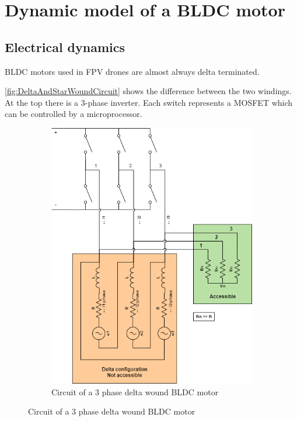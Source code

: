 \documentclass[]{report}
\begin{document}
\section{Dynamic model of a BLDC motor}

\subsection*{Electrical dynamics}
BLDC motors used in FPV drones are almost always delta terminated.

\autoref{fig:DeltaAndStarWoundCircuit} shows the difference between the two windings. At the top there is a 3-phase inverter. Each switch represents a MOSFET which can be controlled by a microprocessor.

\begin{figure}[H]
	\centering
	\begin{subfigure}{0.49\textwidth}
		\centering
		\includegraphics[width=\textwidth]{Draw_IO/BLDC_Dynamics_deltaCircuit.png}
		\caption{Circuit of a 3 phase delta wound BLDC motor}

\end{subfigure}
\end{figure}
\end{document}
